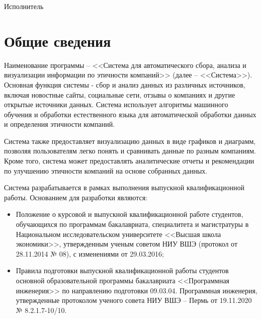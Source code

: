 {{{{\begin{flushright}
\begin{minipage}[t]{0.4\textwidth}
        \vspace{3mm}
        \makebox[6cm][r]{<<\rule{7mm}{0.4pt}>>\hrulefill~\the\year}
      \end{minipage}
    \end{flushright}
    \vspace{10mm}
    \begin{flushright}
      \begin{minipage}[t]{0.4\textwidth}
        Исполнитель

        \vspace{3mm}
        \makebox[6cm][r]{<<\rule{7mm}{0.4pt}>>\hrulefill~\the\year}
      \end{minipage}
    \end{flushright}
  }
}
\newpage
}
\section{Общие сведения}
Наименование программы – <<Система для автоматического сбора, анализа и визуализации информации по этичности компаний>> (далее – <<Система>>). Основная функция системы - сбор и анализ данных из различных источников, включая новостные сайты, социальные сети, отзывы о компаниях и другие открытые источники данных. Система использует алгоритмы машинного обучения и обработки естественного языка для автоматической обработки данных и определения этичности компаний.

Система также предоставляет визуализацию данных в виде графиков и диаграмм, позволяя пользователям легко понять и сравнивать данные по разным компаниям. Кроме того, система может предоставлять аналитические отчеты и рекомендации по улучшению этичности компаний на основе собранных данных.

Система разрабатывается в рамках выполнения выпускной квалификационной работы. Основанием для разработки являются:
\begin{itemize}
  \item Положение о курсовой и выпускной квалификационной работе студентов, обучающихся по программам бакалавриата, специалитета и магистратуры в Национальном исследовательском университете <<Высшая школа экономики>>, утвержденным ученым советом НИУ ВШЭ (протокол от 28.11.2014 № 08), с изменениями от 29.03.2016;
  \item Правила подготовки выпускной квалификационной работы студентов основной образовательной программы бакалавриата <<Программная инженерия>> по направлению подготовки 09.03.04. Программная инженерия, утвержденные протоколом ученого совета НИУ ВШЭ – Пермь от 19.11.2020 № 8.2.1.7-10/10.
\end{itemize}

}
